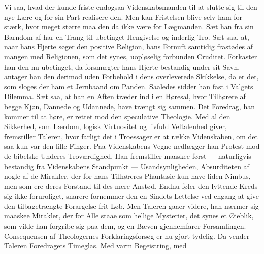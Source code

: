 Vi saa, hvad der kunde friste endogsaa Videnskabsmanden til at slutte sig til
den nye Lære og for sin Part realisere den. Men kan Fristelsen blive selv ham
for stærk, hvor meget større maa den da ikke være for Lægmanden. Sæt han fra
sin Barndom af har en Trang til ubetinget Hengivelse og inderlig Tro. Sæt
saa, at, naar hans Hjerte søger den positive Religion, hans Fornuft samtidig
frastødes af mangen med Religionen, som det synes, uopløselig forbunden
Cruditet. Forkaster han den nu ubetinget, da forsmægter hans Hjerte bestandig
under sit Savn, antager han den derimod uden Forbehold i dens overleverede
Skikkelse, da er det, som sloges der ham et Jernbaand om Panden. Saaledes
sidder han fast i Valgets Dilemma. Sæt saa, at han en Aften træder ind i en
Høresal, hvor Tilhørere af begge Kjøn, Dannede og Udannede, have trængt sig
sammen. Det Foredrag, han kommer til at høre, er rettet mod den speculative
Theologie. Med al den Sikkerhed, som Lærdom, logisk Virtuositet og livfuld
Veltalenhed giver, fremstiller Taleren,
hvor farligt det i Troessager er at række Videnskaben, om det saa
kun var den lille Finger. Paa Videnskabens Vegne nedlægger han Protest mod de
bibelske Underes Troværdighed. Han fremstiller maaskee først --- naturligvis
bestandig fra Videnskabens Standpunkt --- Usandsynligheden, Absurditeten af
nogle af de Mirakler, der for hans Tilhøreres Phantasie kun have liden Nimbus,
men som ere deres Forstand til des mere Anstød. Endnu føler den lyttende Kreds
sig ikke foruroliget, snarere fornemmer den en Sindets Lettelse ved engang at
give den tilbagetrængte Forargelse frit Løb. Men Taleren gaaer videre, han
nærmer sig maaskee Mirakler, der for Alle staae som hellige Mysterier, det
synes et Øieblik, som vilde han forgribe sig paa dem, og en Bæven gjennemfarer
Forsamlingen. Consequensen af Theologernes Forklaringsforsøg er nu gjort
tydelig. Da vender Taleren Foredragets Timeglas. Med varm Begeistring, med
